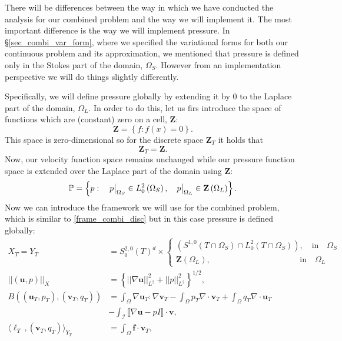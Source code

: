 \documentclass[12pt,a4paper]{article}
\theoremstyle{definition}
\newcommand\restr[2]{{%
		\left.\kern-\nulldelimiterspace %
		#1 %
		\vphantom{\big|} %
		\right|_{#2} %
}}
\begin{document}
There will be differences between the way in which we have conducted the analysis for our combined problem and the way we will implement it.  The most important difference is the way we will implement pressure.  In \S \ref{sec_combi_var_form}, where we specified the variational forms for both our continuous problem and its approximation, we mentioned that pressure is defined only in the Stokes part of the domain, $\Omega_S$.  However from an implementation perspective we will do things slightly differently.

Specifically, we will define pressure globally by extending it by $0$ to the Laplace part of the domain, $\Omega_L$.  In order to do this, let us firs introduce the space of functions which are (constant) zero on a cell, $\textbf{Z}$:
\begin{equation}
\textbf{Z}=\left\lbrace  f: f\left(x\right)=0 \right\rbrace.
\end{equation}
 This space is zero-dimensional so for the discrete space $\textbf{Z}_T$ it holds that
\begin{equation}
\textbf{Z}_T=\textbf{Z}.\nonumber 
\end{equation}
 Now, our velocity function space remains unchanged while our pressure function space is extended over the Laplace part of the domain using $\textbf{Z}$:
\begin{equation}\label{extended_pressure_space}
\mathbb{P}=\left\lbrace p: \quad \restr{p}{{\Omega_S}}\in L^2_0\left(\Omega_S\right),\quad  \restr{p}{{\Omega_L}}\in\textbf{Z}\left(\Omega_L\right)\right\rbrace.
\end{equation}
Now we can introduce the framework we will use for the combined problem, which is similar to \ref{frame_combi_disc} but in this case pressure is defined globally:
\begin{equation}
\begin{aligned}
X_T=Y_T&=S_0^{2,0}\left(T\right)^d\times \begin{cases}
\left(S^{1,0}\left(T\cap\Omega_S\right)\cap L^2_0\left(T\cap\Omega_S\right)\right),\quad\text{in}\quad\Omega_S\\
\textbf{Z}\left(\Omega_L\right),\quad\quad\quad\quad\quad\quad\quad\quad\quad\quad\,\,\,\,\,\text{in}\quad\Omega_L
\end{cases}\\
\left|\left|\left(\textbf{u},p\right)\right|\right|_X&=\left\lbrace \left|\left|\nabla\textbf{u}\right|\right|^2_{L^2} + \left|\left|p\right|\right|^2_{L^2}\right\rbrace^{1/2},\\
B\left(\left(\textbf{u}_T,p_T\right),\left(\textbf{v}_T,q_T\right)\right)&=\int_{\Omega}\nabla \textbf{u}_T : \nabla \textbf{v}_T - \int_{\Omega} p_T \nabla\cdot\textbf{v}_T + \int_{\Omega} q_T \nabla\cdot\textbf{u}_T\\&-\int_{\mathcal{I}} \llbracket\nabla\textbf{u}-pI\rrbracket\cdot\textbf{v},\\
\langle \ell_T\,,\left(\textbf{v}_T,q_T\right) \rangle_{Y_T} &= \int_{\Omega}\textbf{f}\cdot \textbf{v}_T,
\end{aligned}
\end{equation}
\end{document}
